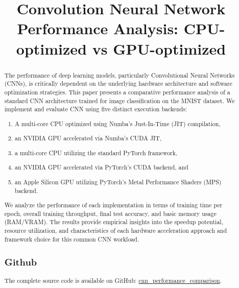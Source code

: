 \documentclass[conference]{IEEEtran} %
\begin{document}
\title{Convolution Neural Network Performance Analysis: CPU-optimized vs GPU-optimized}

\author{
}

\maketitle

\begin{abstract}
    The performance of deep learning models, particularly Convolutional Neural Networks (CNNs), is critically dependent on the underlying hardware architecture and software optimization strategies. This paper presents a comparative performance analysis of a standard CNN architecture trained for image classification on the MNIST dataset. We implement and evaluate CNN using five distinct execution backends:
    \begin{enumerate}
        \item A multi-core CPU optimized using Numba's Just-In-Time (JIT) compilation,
        \item an NVIDIA GPU accelerated via Numba's CUDA JIT,
        \item a multi-core CPU utilizing the standard PyTorch framework,
        \item an NVIDIA GPU accelerated via PyTorch's CUDA backend, and
        \item an Apple Silicon GPU utilizing PyTorch's Metal Performance Shaders (MPS) backend.
    \end{enumerate}
    We analyze the performance of each implementation in terms of training time per epoch, overall training throughput, final test accuracy, and basic memory usage (RAM/VRAM). The results provide empirical insights into the speedup potential, resource utilization, and characteristics of each hardware acceleration approach and framework choice for this common CNN workload. 
    \\
    \subsection*{Github}
    \label{sec:github}
    The complete source code is available on GitHub: 
    \href{https://github.com/geetikak13/cnn_performance_comparison}{\color{blue}cnn\_performance\_comparison}.
\end{abstract}
\end{document}
